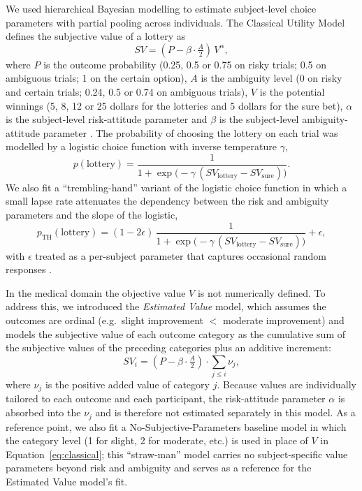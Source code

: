 \documentclass[11pt]{article}
\begin{document}
We used hierarchical Bayesian modelling to estimate subject-level choice parameters with partial pooling across individuals. The Classical Utility Model defines the subjective value of a lottery as
\begin{equation}
SV = \left(P - \beta \cdot \tfrac{A}{2}\right)\, V^{\alpha},
\label{eq:classical}
\end{equation}
where $P$ is the outcome probability (0.25, 0.5 or 0.75 on risky trials; 0.5 on ambiguous trials; 1 on the certain option), $A$ is the ambiguity level (0 on risky and certain trials; 0.24, 0.5 or 0.74 on ambiguous trials), $V$ is the potential winnings (5, 8, 12 or 25 dollars for the lotteries and 5 dollars for the sure bet), $\alpha$ is the subject-level risk-attitude parameter and $\beta$ is the subject-level ambiguity-attitude parameter \citep{levy2012measuring}. The probability of choosing the lottery on each trial was modelled by a logistic choice function with inverse temperature $\gamma$,
\begin{equation}
p(\text{lottery}) = \frac{1}{1 + \exp\!\big(-\gamma\,(SV_{\text{lottery}} - SV_{\text{sure}})\big)}.
\label{eq:logistic}
\end{equation}
We also fit a ``trembling-hand'' variant of the logistic choice function in which a small lapse rate attenuates the dependency between the risk and ambiguity parameters and the slope of the logistic,
\begin{equation}
p_{\text{TH}}(\text{lottery}) = (1 - 2\epsilon)\,\frac{1}{1 + \exp\!\big(-\gamma\,(SV_{\text{lottery}} - SV_{\text{sure}})\big)} + \epsilon,
\label{eq:trembling}
\end{equation}
with $\epsilon$ treated as a per-subject parameter that captures occasional random responses \citep{wu2016loss}.

In the medical domain the objective value $V$ is not numerically defined. To address this, we introduced the \emph{Estimated Value} model, which assumes the outcomes are ordinal (e.g.\ slight improvement $<$ moderate improvement) and models the subjective value of each outcome category as the cumulative sum of the subjective values of the preceding categories plus an additive increment:
\begin{equation}
SV_i = \left(P - \beta \cdot \tfrac{A}{2}\right) \cdot \sum_{j \le i} \nu_j,
\label{eq:estvalue}
\end{equation}
where $\nu_j$ is the positive added value of category $j$. Because values are individually tailored to each outcome and each participant, the risk-attitude parameter $\alpha$ is absorbed into the $\nu_j$ and is therefore not estimated separately in this model. As a reference point, we also fit a No-Subjective-Parameters baseline model in which the category level (1 for slight, 2 for moderate, etc.) is used in place of $V$ in Equation~\ref{eq:classical}; this ``straw-man'' model carries no subject-specific value parameters beyond risk and ambiguity and serves as a reference for the Estimated Value model's fit.
\end{document}

